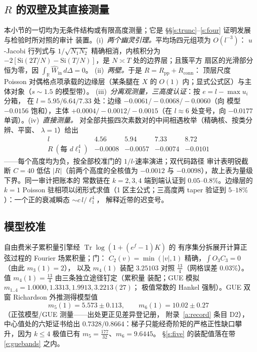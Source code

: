\documentclass[11pt]{article}
\numberwithin{equation}{section}
\theoremstyle{definition}
\theoremstyle{remark}
\newcommand{\Si}{\mathrm{Si}}
\begin{document}
\subsection{$R$ 的双壁及其直接测量}\label{s:cert:walls}

本小节的一切均为无条件结构或有限高度测量；它是
\S\S\ref{s:trunc}--\ref{s:four} 证明发展与检验时所对照的审计
装置。(i)~\emph{两个幽灵引理。}平均场四元组项为 $O(l^{-3})$：
$u$-Jacobi 行列式与 $1/\sqrt{N_1N_2}$ 精确相消，内核积分为
$-2[\Si(2T/N)-\Si(T/N)]$，是 $N\asymp T$ 处的边界层；且簇平方
扇区的光滑部分恒为零，因
$\int_{\mathbb R}\widehat W_{\mathrm{in}}\,d\Delta=0$。
(ii)~\emph{两壁。}于是 $R=R_{\mathrm{pp}}+R_{\mathrm{conn}}$：
顶层尺度 Poisson 对偶格点项承载的边缘层（某条腿在 $X$ 的
$O(1)$ 内；显式公式区）与主体对象（$s\sim1.5$ 的模型带）。
(iii)~\emph{分离观测量，三高度认证}：按 $e=l-\max u_i$ 分箱，
在 $l=5.95/6.64/7.33$ 处：边缘 $-0.0061/-0.0068/-0.0060$（向
模型 $-0.0156$ 饱和），主体 $+0.0004/-0.0012/-0.0015$（在
$l\approx6$ 处变号，向 $-0.0177$ 单调）。(iv)~\emph{直接测量。}
对全部共振四次素数对的中间相遇枚举（精确核、按类分辨、平窗、
$\lambda=1$）给出
\[
\begin{array}{lcccc}
l & 4.56 & 5.94 & 7.33 & 8.72\\
R\ (\text{每 }d\ell_1^4) & -0.0008 & -0.0057 & -0.0074 & -0.0101
\end{array}
\]
——每个高度均为负，按全部校准门的 $1/l$-速率演进；双代码路径
审计表明锐截断 $C=40$ 低估 $|R|$（前两个高度的全核值为
$-0.0012$ 与 $-0.0098$），故上表为量级下界。同一审计把账本的
常数链在 $k=2,3,4$ 端到端认证到 $0.05$--$0.8\%$。边缘层的
$k{=}1$ Poisson 驻相项以闭形式求值（1 区主公式；三高度两 taper
验证到 $5$--$18\%$）：一个正的衰减瞬态 $\sim c\,l/\ell_1^4$，
解释近带的迟变号。

\subsection{模型校准}\label{s:cert:model}

自由费米子累积量引擎经 $\operatorname{Tr}\log(1+(e^f-1)K)$ 的
有序集分拆展开计算正弦过程的 Fourier 场累积量；门：
$C_2(v)=\min(|v|,1)$ 精确，$\int O_3C_3=0$（由此 $m_3(1)=2$），
以及 $m_4(1)$ 装配 $3.25103$ 对照 $\tfrac{13}4$（网格误差
$0.03\%$）。值 $m_4(1)=\tfrac{13}4$ 由三条独立途径钉定（累积量
装配；GUE 模拟 $m_{1..4}=1.0000,1.3313,1.9913,3.2213(27)$；
极值常数的 Hankel 强制）。GUE 双窗 Richardson 外推测得模型值
\begin{equation}\label{e:guebands}
m_5(1)=5.573\pm0.113,\qquad m_6(1)=10.02\pm0.27
\end{equation}
（正弦模型/GUE 测量——出处更正见差异登记册，
附录~\ref{a:record} 条目 D2），中心值处的六矩证书给出
$0.7328/0.8664$：梯子只能经奇阶矩的严格正性缺口攀升，因为
$k\le4$ 极值已有 $m_5=\tfrac{177}{32}$、$m_6=9.6445$。
\S\ref{s:five} 的装配值落在带 \eqref{e:guebands} 之内。
\end{document}
